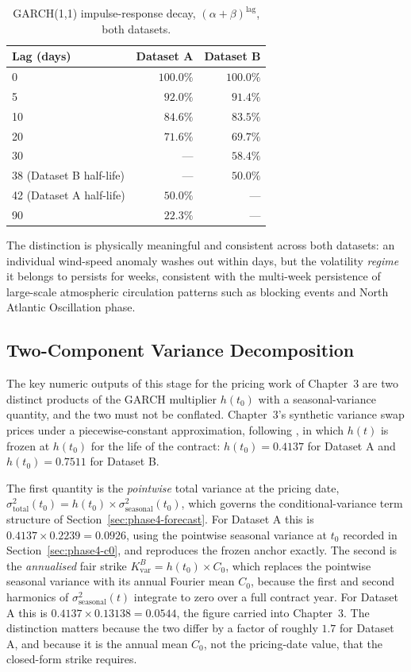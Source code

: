 \documentclass[11pt, a4paper, twoside]{article}
\begin{document}
\begin{table}[htbp]
\centering
\caption{GARCH(1,1) impulse-response decay, $(\alpha+\beta)^{\text{lag}}$, both datasets.}
\label{tab:garch-impulse}
\begin{tabular}{l r r}
\toprule
\textbf{Lag (days)} & \textbf{Dataset A} & \textbf{Dataset B} \\
\midrule
0 & $100.0\%$ & $100.0\%$ \\
5 & $92.0\%$ & $91.4\%$ \\
10 & $84.6\%$ & $83.5\%$ \\
20 & $71.6\%$ & $69.7\%$ \\
30 & --- & $58.4\%$ \\
38 (Dataset B half-life) & --- & $50.0\%$ \\
42 (Dataset A half-life) & $50.0\%$ & --- \\
90 & $22.3\%$ & --- \\
\bottomrule
\end{tabular}
\end{table}

The distinction is physically meaningful and consistent across both datasets: an individual wind-speed anomaly washes out within days, but the volatility \emph{regime} it belongs to persists for weeks, consistent with the multi-week persistence of large-scale atmospheric circulation patterns such as blocking events and North Atlantic Oscillation phase.

\subsection{Two-Component Variance Decomposition}
\label{sec:phase3-decomp}

The key numeric outputs of this stage for the pricing work of Chapter~3 are two distinct products of the GARCH multiplier $h(t_0)$ with a seasonal-variance quantity, and the two must not be conflated. Chapter~3's synthetic variance swap prices under a piecewise-constant approximation, following \citet{Tol1997}, in which $h(t)$ is frozen at $h(t_0)$ for the life of the contract: $h(t_0) = 0.4137$ for Dataset A and $h(t_0) = 0.7511$ for Dataset B.

The first quantity is the \emph{pointwise} total variance at the pricing date, $\sigma^2_{\text{total}}(t_0) = h(t_0) \times \sigma^2_{\text{seasonal}}(t_0)$, which governs the conditional-variance term structure of Section~\ref{sec:phase4-forecast}. For Dataset A this is $0.4137 \times 0.2239 = 0.0926$, using the pointwise seasonal variance at $t_0$ recorded in Section~\ref{sec:phase4-c0}, and reproduces the frozen anchor exactly. The second is the \emph{annualised} fair strike $K_{\text{var}}^B = h(t_0) \times C_0$, which replaces the pointwise seasonal variance with its annual Fourier mean $C_0$, because the first and second harmonics of $\sigma^2_{\text{seasonal}}(t)$ integrate to zero over a full contract year. For Dataset A this is $0.4137 \times 0.13138 = 0.0544$, the figure carried into Chapter~3. The distinction matters because the two differ by a factor of roughly $1.7$ for Dataset A, and because it is the annual mean $C_0$, not the pricing-date value, that the closed-form strike requires.
\end{document}
